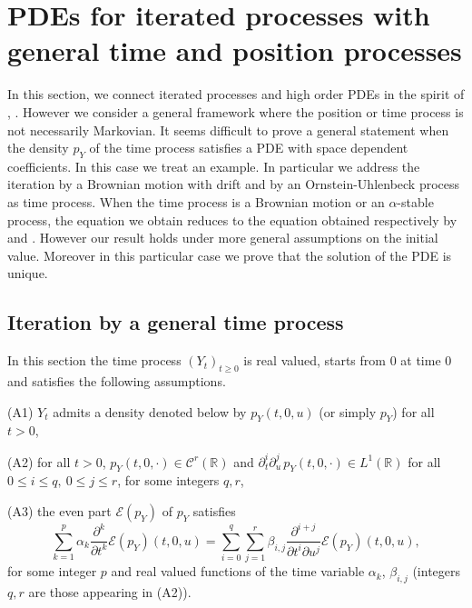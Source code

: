 \documentclass[a4paper, 11pt]{article}
\newcommand{\R}{\mathbb{R}}
\newcommand{\1}{\mathbf{1}}
\begin{document}
\section{PDEs for iterated processes with general time and position processes}\label{pdes}


\noindent In this section, we connect iterated processes and high order PDEs in the spirit of \cite{allouba}, \cite{erkan}. However we consider a general framework where the position or time process is not necessarily Markovian. It seems difficult to prove a general statement when the density $p_Y$ of the time process satisfies a PDE with space dependent coefficients. In this case we treat an example. In particular we address the iteration by a Brownian motion with drift and by an Ornstein-Uhlenbeck process as time process. When the time process is a Brownian motion or an $\alpha$-stable process, the equation we obtain reduces to the equation obtained respectively by \cite{allouba} and \cite{erkan}. However our result holds under more general assumptions on the initial value. Moreover in this particular case we prove that the solution of the PDE is unique.

\bigskip


\subsection{Iteration by a general time process}

\noindent In this section the time process $(Y_t)_{t\geq 0}$ is real valued, starts from $0$ at time $0$ and satisfies the following assumptions. 

\medskip


\noindent (A1) $Y_t$ admits a density denoted below by $p_Y(t,0,u)$ (or simply $p_Y$) for all $t>0$,

\smallskip

\noindent (A2) for all $t>0$, $p_Y(t,0,\cdot)\in \mathcal{C}^{r}(\R)$ and $\partial^i_t \partial^j_u \, p_Y(t,0,\cdot)\in L^1(\R)$ for all  $0\leq i\leq q,\ 0\leq j \leq r$, for some integers $q,r$, 

\smallskip

\noindent (A3) the even part $\mathcal{E}(p_Y)$ of $p_Y$ satisfies
\begin{equation}
\label{edpdensiteY}
\sum_{k=1}^{p} \alpha_k \frac{\partial^k}{\partial t^k}\mathcal{E}(p_Y)(t,0,u)=\sum_{i=0}^{q} \sum_{j=1}^{r} \beta_{i,j}\frac{\partial^{i+j}}{\partial t^i \partial u^j}\mathcal{E}(p_Y)(t,0,u),
\end{equation}
 for some integer $p$ and real valued functions of the time variable $\alpha_k$, $\beta_{i,j}$ (integers $q,r$ are those appearing in (A2)).
\end{document}
